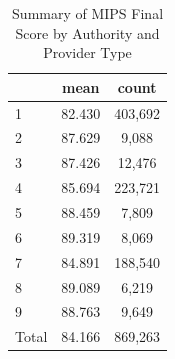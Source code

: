 \begin{table}[htbp]\centering
\def\sym#1{\ifmmode^{#1}\else\(^{#1}\)\fi}
\caption{Summary of MIPS Final Score by Authority and Provider Type}
\begin{tabular}{l*{1}{cc}}
\toprule
                    &        mean&       count\\
\midrule
1                   &      82.430&     403,692\\
2                   &      87.629&       9,088\\
3                   &      87.426&      12,476\\
4                   &      85.694&     223,721\\
5                   &      88.459&       7,809\\
6                   &      89.319&       8,069\\
7                   &      84.891&     188,540\\
8                   &      89.089&       6,219\\
9                   &      88.763&       9,649\\
Total               &      84.166&     869,263\\
\bottomrule
\end{tabular}
\end{table}
